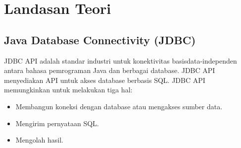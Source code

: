 \chapter{Landasan Teori}
\label{chap:LandasanTeori}

%
%
%
%


\section{Java Database Connectivity (JDBC)}
\label{sec:jdbc}
JDBC API \cite{jdbc} adalah standar industri untuk konektivitas basisdata-independen antara bahasa pemrograman Java dan berbagai database. JDBC API menyediakan API untuk akses database berbasis SQL. JDBC API memungkinkan untuk melakukan tiga hal: 
\begin{itemize}
	\item Membangun koneksi dengan database atau mengakses sumber data.
	\item Mengirim pernyataan SQL.
	\item Mengolah hasil.
\end{itemize}

